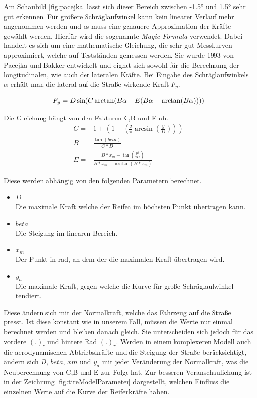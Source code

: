 \documentclass{like}
\begin{document}
Am Schaubild \ref{fig:pacejka} lässt sich dieser Bereich zwischen -1.5° und 1.5° sehr gut erkennen. Für größere Schräglaufwinkel kann kein linearer Verlauf mehr angenommen werden und es muss eine genauere Approximation der Kräfte gewählt werden. Hierfür wird die sogenannte \textit{Magic Formula}  \cite{magicFormula} verwendet. Dabei handelt es sich um eine mathematische Gleichung, die sehr gut Messkurven approximiert, welche auf Testständen gemessen werden.
Sie wurde 1993 von Pacejka und Bakker entwickelt und eignet sich sowohl für die Berechnung der longitudinalen, wie auch der lateralen Kräfte. Bei Eingabe des Schräglaufwinkels \(\alpha\) erhält man die lateral auf die Straße wirkende Kraft \(F_y\). 

\begin{equation}
F_y =  D\sin(C\arctan(B\alpha - E(B\alpha - \arctan(B\alpha))))  \label{eq:magicF} \\
\end{equation}

Die Gleichung hängt von den Faktoren C,B und E ab. 
\begin{eqnarray}
C =& 1 + (1-(\frac{2}{\pi} \arcsin(\frac{y}{D}))) \\
B =& \frac{\tan(beta)}{C*D} \\
E =& \frac{ B * x_m - \tan(\frac{pi}{2 C})}{B*x_m - \arctan(B*x_m)}
\end{eqnarray}


Diese werden abhängig von den folgenden Parametern berechnet.

\begin{itemize}
	\item $D$ \\	
	Die maximale Kraft welche der Reifen im höchsten Punkt übertragen kann.
	\item $beta$\\
	Die Steigung im linearen Bereich. 
	\item $x_m$ \\
	Der Punkt in rad, an dem der die maximalen Kraft übertragen wird.
	\item $y_a$ \\
	Die maximale Kraft, gegen welche die Kurve für große Schräglaufwinkel tendiert. 
\end{itemize}

Diese ändern sich mit der Normalkraft, welche das Fahrzeug auf die Straße presst. Ist diese konstant wie in unserem Fall, müssen die Werte nur einmal berechnet werden und bleiben danach gleich. Sie unterscheiden sich jedoch für das vordere $(.)_r$ und hintere Rad $(.)_r$. Werden in einem komplexeren Modell auch die aerodynamischen Abtriebskräfte und die Steigung der Straße berücksichtigt, ändern sich $D$, $beta$, $xm$ und $y_a$ mit jeder Veränderung der Normalkraft, was die Neuberechnung von C,B und E zur Folge hat. Zur besseren Veranschaulichung ist in der Zeichnung \ref{fig:tireModelParameter} dargestellt, welchen Einfluss die einzelnen Werte auf die Kurve der Reifenkräfte haben. 
\end{document}
